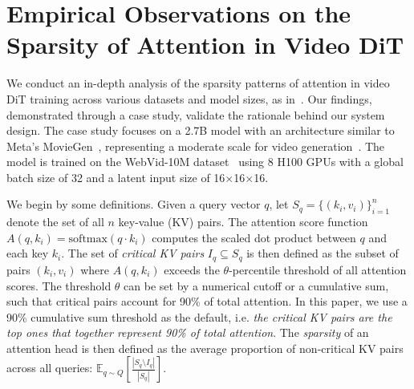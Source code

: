 
\section{Empirical Observations on the Sparsity of Attention in Video DiT}
\label{sec:finding}





We conduct an in-depth analysis of the sparsity patterns of attention in video DiT training across various datasets and model sizes, as in~. Our findings, demonstrated through a case study, validate the rationale behind our system design. 
The case study focuses on a 2.7B model with an architecture similar to Meta's MovieGen~\cite{polyak2024movie}, representing a moderate scale for video generation~\cite{OpenSora,HunyuanVideo,ma2024latte}. The model is trained on the WebVid-10M dataset~\cite{Bain21webvid_10M} using 8 H100 GPUs with a global batch size of 32 and a latent input size of 16$\times$16$\times$16.





We begin by some definitions.
Given a query vector $q$, let $S_q = \{(k_i, v_i)\}_{i=1}^n$ denote the set of all $n$ key-value (KV) pairs. The attention score function $A(q, k_i) = \text{softmax}(q \cdot k_i)$ computes the scaled dot product between $q$ and each key $k_i$. The set of \textit{critical KV pairs} $I_q \subseteq S_q$ is then defined as the subset of pairs $(k_i, v_i)$ where $A(q, k_i)$ exceeds the $\theta$-percentile threshold of all attention scores.
The threshold $\theta$ can be set by a numerical cutoff or a cumulative sum, such that critical pairs account for 90\% of total attention. In this paper, we use a 90\% cumulative sum threshold as the default, i.e. {\textit{the critical KV pairs are the top ones that together represent 90\% of total attention}}.
The \textit{sparsity} of an attention head is then defined as the average proportion of non-critical KV pairs across all queries: $\mathbb{E}_{q \sim Q}\left[\frac{|S_q \setminus I_q|}{|S_q|}\right]$.









